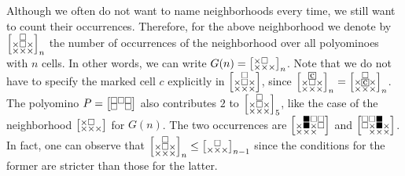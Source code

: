 \documentclass[a4paper,12pt]{article}
\makeatletter
\newcommand{\mybox}[1]{%
  \begingroup
  \setlength{\fboxsep}{1pt}%
  \fbox{\small #1}%
  \endgroup
}
\newenvironment{grid}
  {\begingroup\footnotesize
   \renewcommand{\arraystretch}{0}
   \setlength{\arraycolsep}{0pt}
   \left[\begin{array}{@{}*{10}{c}@{}}}
  {\end{array}\right]\endgroup}
\newcommand{\void}{\phantom{\times}}
\newcommand{\myF}{
    \begin{grid}
        \void & \square & \void \\
        \times & \times & \times
    \end{grid}
}
\newcommand{\myG}{
    \begin{grid}
        \times & \square & \void \\
        \times & \times & \times
    \end{grid}
}
\makeatother
\begin{document}
Although we often do not want to name neighborhoods every time, we still want to count their occurrences. Therefore, for the above neighborhood we denote by $\begin{grid}
        \void & \square & \void \\
        \times & \square & \times \\
        \times & \times & \times
    \end{grid}_n$ the number of occurrences of the neighborhood over all polyominoes with $n$ cells. In other words, we can write $G(n)=\myG_n$. Note that we do not have to specify the marked cell $c$ explicitly in $\begin{grid}
        \void & \square & \void \\
        \times & \square & \times \\
        \times & \times & \times
    \end{grid}$, since $\begin{grid}
        \void & \mybox{c} & \void \\
        \times & \square & \times \\
        \times & \times & \times
    \end{grid}_n = \begin{grid}
        \void & \square & \void \\
        \times & \mybox{c} & \times \\
        \times & \times & \times
    \end{grid}_n$. The polyomino $P=\begin{grid}
    \square & \square & \square \\
    \square & \void & \square
\end{grid}$ also contributes $2$ to $\begin{grid}
        \void & \square & \void \\
        \times & \square & \times \\
        \times & \times & \times
    \end{grid}_5$, like the case of the neighborhood $\myG$ for $G(n)$.
    The two occurrences are $\begin{grid}
    \void & \blacksquare & \square & \square \\
    \times & \blacksquare & \times & \square \\
    \times & \times & \times & \void 
\end{grid}$ and $\begin{grid}
    \square & \square & \blacksquare & \void \\
    \square & \times & \blacksquare & \times \\
    \void & \times & \times & \times
\end{grid}$.
    In fact, one can observe that $\begin{grid}
        \void & \square & \void \\
        \times & \square & \times \\
        \times & \times & \times
    \end{grid}_n\le \myF_{n-1}$ since the conditions for the former are stricter than those for the latter.
\end{document}
